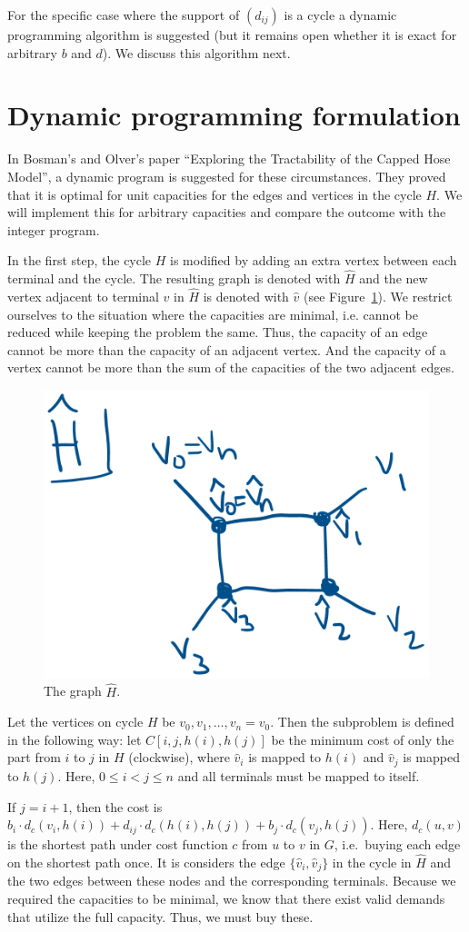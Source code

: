 \documentclass[11pt]{article}
\begin{document}
    For the specific case where the support of $(d_{ij})$ is a cycle a dynamic programming algorithm is suggested (but it remains open whether it is exact for arbitrary $b$ and $d$).
    We discuss this algorithm next.

    \section{Dynamic programming formulation}
    In Bosman's and Olver's paper ``Exploring the Tractability of the Capped Hose Model'', a dynamic program is suggested for these circumstances.
    They proved that it is optimal for unit capacities for the edges and vertices in the cycle $H$.
    We will implement this for arbitrary capacities and compare the outcome with the integer program.

    In the first step, the cycle $H$ is modified by adding an extra vertex between each terminal and the cycle.
    The resulting graph is denoted with $\hat H$ and the new vertex adjacent to terminal $v$ in $\hat H$ is denoted with $\hat v$ (see Figure~\ref{fig:hdak}).
    We restrict ourselves to the situation where the capacities are minimal, i.e. cannot be reduced while keeping the problem the same.
    Thus, the capacity of an edge cannot be more than the capacity of an adjacent vertex.
    And the capacity of a vertex cannot be more than the sum of the capacities of the two adjacent edges.

    \begin{figure}
        \centering
        \includegraphics[width=.35\textwidth]{hdak.png}
        \caption{The graph $\hat H$.} \label{fig:hdak}
    \end{figure}

    Let the vertices on cycle $H$ be $v_0, v_1, \dots, v_n = v_0$.
    Then the subproblem is defined in the following way: let $C[i, j, h(i), h(j)]$ be the minimum cost of only the part from $i$ to $j$ in $H$ (clockwise), where $\hat v_i$ is mapped to $h(i)$ and $\hat v_j$ is mapped to $h(j)$.
    Here, $0 \le i < j \le n$ and all terminals must be mapped to itself.

    If $j = i + 1$, then the cost is $b_i \cdot d_c(v_i, h(i)) + d_{ij} \cdot d_c(h(i), h(j)) + b_j \cdot d_c(v_j, h(j))$.
    Here, $d_c(u, v)$ is the shortest path under cost function $c$ from $u$ to $v$ in $G$, i.e.\ buying each edge on the shortest path once.
    It is considers the edge $\{\hat v_i, \hat v_j\}$ in the cycle in $\hat H$ and the two edges between these nodes and the corresponding terminals.
    Because we required the capacities to be minimal, we know that there exist valid demands that utilize the full capacity.
    Thus, we must buy these.
\end{document}
